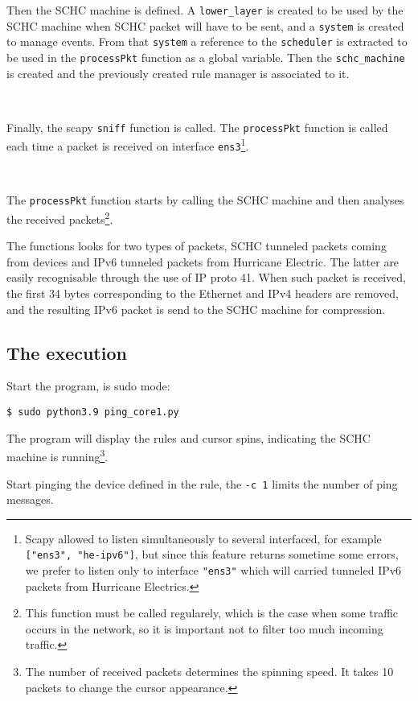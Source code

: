 Then the SCHC machine is defined. A \texttt{lower\_layer} is created to be used by the SCHC machine when SCHC packet will have to be sent, and a \texttt{system} is created to manage events. From that \texttt{system} a reference to the \texttt{scheduler} is extracted to be used in the \texttt{processPkt} function as a global variable. Then the \texttt{schc\_machine} is created and the previously created rule manager is associated to it.

~~~

Finally, the scapy \texttt{sniff} function is called. The \texttt{processPkt} function is called each time a packet is received on interface \texttt{ens3}\footnote{Scapy allowed to listen simultaneously to several interfaced, for example \texttt{["ens3", "he-ipv6"]}, but since this feature returns sometime some errors, we prefer to listen only to interface \texttt{"ens3"} which will carried tunneled IPv6 packets from Hurricane Electrics.}.

~~~

The \texttt{processPkt} function starts by calling the SCHC machine and then analyses the received packets\footnote{This function must be called regularely, which is the case when some traffic occurs in the network, so it is important not to filter too much incoming traffic.}. 

The functions looks for two types of packets, SCHC tunneled packets coming from devices and IPv6 tunneled packets from Hurricane Electric. The latter are easily recognisable through the use of IP proto 41. When such packet is received, the first 34 bytes corresponding to the Ethernet and IPv4 headers are removed, and the resulting IPv6 packet is send to the SCHC machine for compression.

\subsection{The execution}

Start the program, is sudo mode:

\begin{lstlisting}
$ sudo python3.9 ping_core1.py 
\end{lstlisting}

The program will display the rules and cursor spins, indicating the SCHC machine is running\footnote{The number of received packets determines the spinning speed. It takes 10 packets to change the cursor appearance.}. 

Start pinging the device defined in the rule, the \texttt{-c 1} limits the number of ping messages. 

